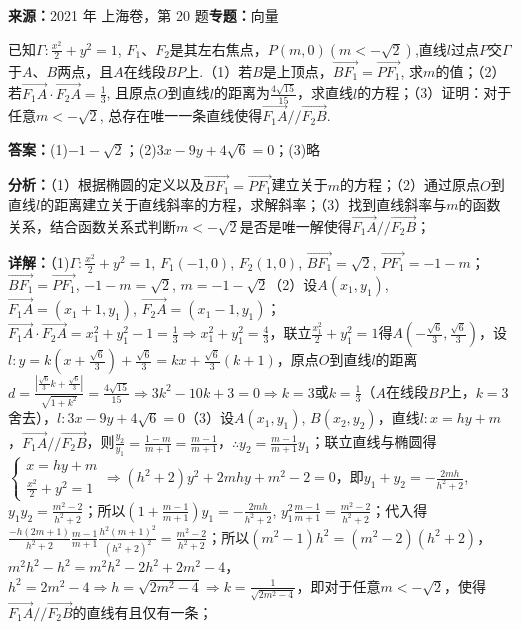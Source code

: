 \begin{question}[points=16]
\textbf{来源：}2021 年 上海卷，第 20 题\quad \textbf{专题：}向量\par
已知$\Gamma:\frac{x^2}{2}+y^2=1$, $F_1$、$F_2$是其左右焦点，$P(m,0)(m<-\sqrt{2})$,直线$l$过点$P$交$\Gamma$于$A$、$B$两点，且$A$在线段$BP$上.（1）若$B$是上顶点，$\overrightarrow{BF_1}=\overrightarrow{PF_1}$, 求$m$的值；（2）若$\overrightarrow{F_1A}\cdot\overrightarrow{F_2A}=\frac{1}{3}$, 且原点$O$到直线$l$的距离为$\frac{4\sqrt{15}}{15}$，求直线$l$的方程；（3）证明：对于任意$m<-\sqrt{2}$, 总存在唯一一条直线使得$\overrightarrow{F_1A}//\overrightarrow{F_2B}$.
\begin{solution}
\textbf{答案：}(1)$-1-\sqrt{2}$；(2)$3x-9y+4\sqrt{6}=0$；(3)略

\textbf{分析：}（1）根据椭圆的定义以及$\overrightarrow{BF_1}=\overrightarrow{PF_1}$建立关于$m$的方程；（2）通过原点$O$到直线$l$的距离建立关于直线斜率的方程，求解斜率；（3）找到直线斜率与$m$的函数关系，结合函数关系式判断$m<-\sqrt{2}$是否是唯一解使得$\overrightarrow{F_1A}//\overrightarrow{F_2B}$；

\textbf{详解：}（1)$\Gamma:\frac{x^2}{2}+y^2=1$, $F_1(-1,0)$, $F_2(1,0)$, $\overrightarrow{BF_1}=\sqrt{2}$, $\overrightarrow{PF_1}=-1-m$；$\overrightarrow{BF_1}=\overrightarrow{PF_1}$, $-1-m=\sqrt{2}$, $m=-1-\sqrt{2}$（2）设$A(x_1,y_1)$, $\overrightarrow{F_1A}=(x_1+1,y_1)$, $\overrightarrow{F_2A}=(x_1-1,y_1)$；$\overrightarrow{F_1A}\cdot\overrightarrow{F_2A}=x_1^2+y_1^2-1=\frac{1}{3}\Rightarrow x_1^2+y_1^2=\frac{4}{3}$，联立$\frac{x_1^2}{2}+y_1^2=1$得$A(-\frac{\sqrt{6}}{3},\frac{\sqrt{6}}{3})$，设$l:y=k(x+\frac{\sqrt{6}}{3})+\frac{\sqrt{6}}{3}=kx+\frac{\sqrt{6}}{3}(k+1)$，原点$O$到直线$l$的距离$d=\frac{|\frac{\sqrt{6}}{3}k+\frac{\sqrt{6}}{3}|}{\sqrt{1+k^2}}=\frac{4\sqrt{15}}{15}\Rightarrow3k^2-10k+3=0\Rightarrow k=3$或$k=\frac{1}{3}$（$A$在线段$BP$上，$k=3$舍去），$l:3x-9y+4\sqrt{6}=0$（3）设$A(x_1,y_1)$, $B(x_2,y_2)$，直线$l:x=hy+m$，$\overrightarrow{F_1A}//\overrightarrow{F_2B}$，则$\frac{y_2}{y_1}=\frac{1-m}{m+1}=\frac{m-1}{m+1}$，$\therefore y_2=\frac{m-1}{m+1}y_1$；联立直线与椭圆得$\begin{cases}x=hy+m\\\frac{x^2}{2}+y^2=1\end{cases}\Rightarrow(h^2+2)y^2+2mhy+m^2-2=0$，即$y_1+y_2=-\frac{2mh}{h^2+2}$, $y_1y_2=\frac{m^2-2}{h^2+2}$；所以$(1+\frac{m-1}{m+1})y_1=-\frac{2mh}{h^2+2}$, $y_1^2\frac{m-1}{m+1}=\frac{m^2-2}{h^2+2}$；代入得$\frac{-h(2m+1)}{h^2+2}\frac{m-1}{m+1}\frac{h^2(m+1)^2}{(h^2+2)^2}=\frac{m^2-2}{h^2+2}$；所以$(m^2-1)h^2=(m^2-2)(h^2+2)$，$m^2h^2-h^2=m^2h^2-2h^2+2m^2-4$，$h^2=2m^2-4\Rightarrow h=\sqrt{2m^2-4}\Rightarrow k=\frac{1}{\sqrt{2m^2-4}}$，即对于任意$m<-\sqrt{2}$，使得$\overrightarrow{F_1A}//\overrightarrow{F_2B}$的直线有且仅有一条；
\end{solution}
\end{question}

